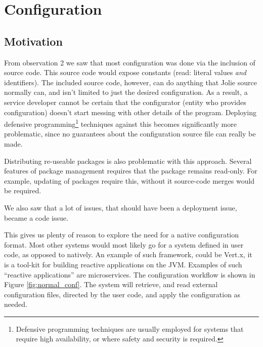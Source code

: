 \section{Configuration}
\label{sec:col}


\subsection{Motivation}

From observation 2 we saw that most configuration was done via the inclusion of
source code. This source code would expose constants (read: literal values
\emph{and} identifiers). The included source code, however, can do anything
that Jolie source normally can, and isn't limited to just the desired
configuration. As a result, a service developer cannot be certain that the
configurator (entity who provides configuration) doesn't start messing with
other details of the program. Deploying defensive
programming\footnote{Defensive programming techniques are usually employed for
systems that require high availability, or where safety and security is
required.} techniques against this becomes significantly more problematic,
since no guarantees about the configuration source file can really be made.

Distributing re-useable packages is also problematic with this approach.
Several features of package management requires that the package remains
read-only. For example, updating of packages require this, without it
source-code merges would be required.

We also saw that a lot of issues, that should have been a deployment issue,
became a code issue.

This gives us plenty of reason to explore the need for a native configuration
format.  Most other systems would most likely go for a system defined in user
code, as opposed to natively. An example of such framework, could be Vert.x, it
is a tool-kit for building reactive applications on the JVM.  Examples of such
``reactive applications'' are microservices. The configuration workflow is
shown in Figure \ref{fig:normal_conf}. The system will retrieve, and read
external configuration files, directed by the user code, and apply the
configuration as needed.


